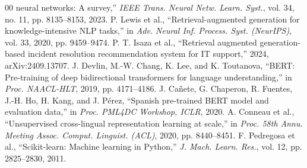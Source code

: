 \documentclass[conference]{IEEEtran}
\begin{document}
\begin{thebibliography}{00}
neural networks: A survey,'' \emph{IEEE Trans. Neural Netw. Learn. Syst.}, vol. 34, no. 11, pp. 8135--8153, 2023.
 P. Lewis et al., ``Retrieval-augmented generation for knowledge-intensive NLP tasks,'' in
\emph{Adv. Neural Inf. Process. Syst. (NeurIPS)}, vol. 33, 2020, pp. 9459--9474.
 P. T. Isaza et al., ``Retrieval augmented generation-based incident resolution
recommendation system for IT support,'' 2024, arXiv:2409.13707.
 J. Devlin, M.-W. Chang, K. Lee, and K. Toutanova, ``BERT: Pre-training of deep
bidirectional transformers for language understanding,'' in \emph{Proc. NAACL-HLT}, 2019, pp. 4171--4186.
 J. Cañete, G. Chaperon, R. Fuentes, J.-H. Ho, H. Kang, and J. Pérez, ``Spanish pre-trained
BERT model and evaluation data,'' in \emph{Proc. PML4DC Workshop, ICLR}, 2020.
 A. Conneau et al., ``Unsupervised cross-lingual representation learning at scale,'' in
\emph{Proc. 58th Annu. Meeting Assoc. Comput. Linguist. (ACL)}, 2020, pp. 8440--8451.
 F. Pedregosa et al., ``Scikit-learn: Machine learning in Python,'' \emph{J. Mach. Learn.
Res.}, vol. 12, pp. 2825--2830, 2011.
\end{thebibliography}
\end{document}
